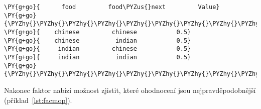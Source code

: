 \begin{example}
\begin{Verbatim}[commandchars=\\\{\}]
\PY{g+go}{      food         food\PYZus{}next         Value}
\PY{g+go}{\PYZhy{}\PYZhy{}\PYZhy{}\PYZhy{}\PYZhy{}\PYZhy{}\PYZhy{}\PYZhy{}\PYZhy{}\PYZhy{}\PYZhy{}\PYZhy{}\PYZhy{}\PYZhy{}\PYZhy{}\PYZhy{}\PYZhy{}\PYZhy{}\PYZhy{}\PYZhy{}\PYZhy{}\PYZhy{}\PYZhy{}\PYZhy{}\PYZhy{}\PYZhy{}\PYZhy{}\PYZhy{}\PYZhy{}\PYZhy{}\PYZhy{}\PYZhy{}\PYZhy{}\PYZhy{}\PYZhy{}\PYZhy{}\PYZhy{}\PYZhy{}\PYZhy{}\PYZhy{}\PYZhy{}\PYZhy{}\PYZhy{}\PYZhy{}\PYZhy{}\PYZhy{}\PYZhy{}\PYZhy{}\PYZhy{}\PYZhy{}}
\PY{g+go}{    chinese         chinese           0.5}
\PY{g+go}{    chinese          indian           0.5}
\PY{g+go}{     indian         chinese           0.5}
\PY{g+go}{     indian          indian           0.5}
\PY{g+go}{\PYZhy{}\PYZhy{}\PYZhy{}\PYZhy{}\PYZhy{}\PYZhy{}\PYZhy{}\PYZhy{}\PYZhy{}\PYZhy{}\PYZhy{}\PYZhy{}\PYZhy{}\PYZhy{}\PYZhy{}\PYZhy{}\PYZhy{}\PYZhy{}\PYZhy{}\PYZhy{}\PYZhy{}\PYZhy{}\PYZhy{}\PYZhy{}\PYZhy{}\PYZhy{}\PYZhy{}\PYZhy{}\PYZhy{}\PYZhy{}\PYZhy{}\PYZhy{}\PYZhy{}\PYZhy{}\PYZhy{}\PYZhy{}\PYZhy{}\PYZhy{}\PYZhy{}\PYZhy{}\PYZhy{}\PYZhy{}\PYZhy{}\PYZhy{}\PYZhy{}\PYZhy{}\PYZhy{}\PYZhy{}\PYZhy{}\PYZhy{}}
\end{Verbatim}
\caption{Normalizace faktoru}
\label{lst:facnor}
\end{example}


Nakonec faktor nabízí možnost zjistit, které ohodnocení jsou nejpravděpodobnější (příklad~\ref{lst:facmop}).

